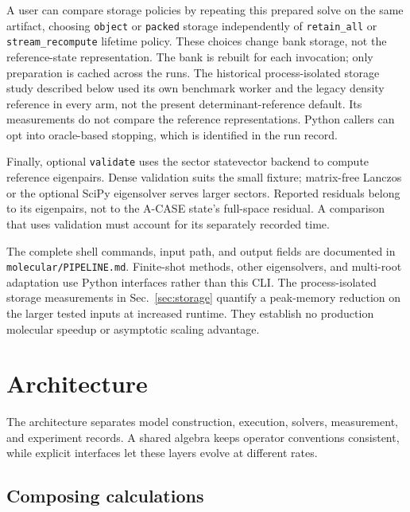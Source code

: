 \documentclass[aps,pra,reprint,superscriptaddress,nofootinbib,floatfix,
  showkeys]{revtex4-2}
\begin{document}
A user can compare storage policies by repeating this prepared solve on the
same artifact, choosing \texttt{object} or \texttt{packed} storage independently
of \texttt{retain\_all} or \texttt{stream\_recompute} lifetime policy.
These choices change bank storage, not the reference-state representation.
The bank is rebuilt for each invocation; only preparation is cached across
the runs. The historical process-isolated storage study described below used
its own benchmark worker and the legacy density reference in every arm, not
the present determinant-reference default. Its measurements do not compare
the reference representations. Python callers can opt into oracle-based stopping, which is identified in the run record.

Finally, optional \texttt{validate} uses the sector statevector backend to
compute reference eigenpairs. Dense validation suits the small fixture;
matrix-free Lanczos or the optional SciPy eigensolver serves larger sectors.
Reported residuals belong to its eigenpairs, not to the A-CASE state's
full-space residual. A comparison that uses validation must account for its
separately recorded time.

The complete shell commands, input path, and output fields are documented
in \texttt{molecular/PIPELINE.md}. Finite-shot methods, other eigensolvers,
and multi-root adaptation use Python interfaces rather than this CLI.
The process-isolated storage measurements in Sec.~\ref{sec:storage} quantify a
peak-memory reduction on the larger tested inputs at increased runtime. They
establish no production molecular speedup or asymptotic scaling advantage.

\section{Architecture}
\label{sec:architecture}

The architecture separates model construction, execution, solvers, measurement,
and experiment records. A shared algebra keeps operator conventions consistent,
while explicit interfaces let these layers evolve at different rates.

\subsection{Composing calculations}
\end{document}
